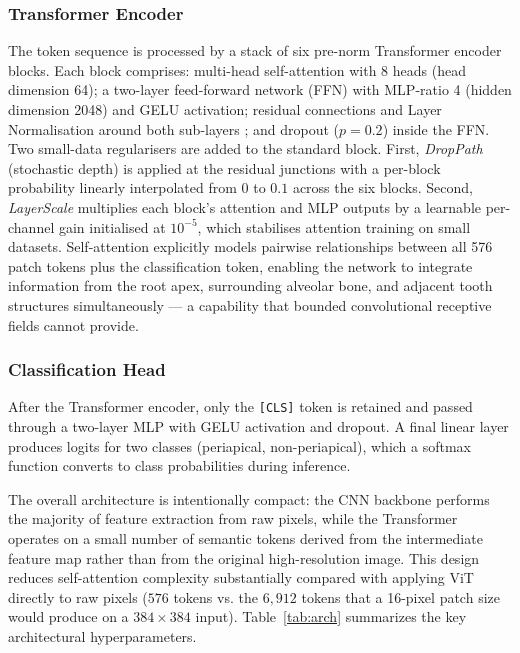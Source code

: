 \documentclass[conference]{IEEEtran}
\begin{document}
\subsubsection{Transformer Encoder}
The token sequence is processed by a stack of six pre-norm Transformer
encoder blocks. Each block comprises: multi-head self-attention with 8 heads
(head dimension 64); a two-layer feed-forward network (FFN) with MLP-ratio 4
(hidden dimension 2048) and GELU activation; residual connections and Layer
Normalisation around both sub-layers \cite{dosovitskiy2021}; and dropout
($p=0.2$) inside the FFN.
Two small-data regularisers are added to the standard block. First,
\emph{DropPath} (stochastic depth) is applied at the residual junctions with
a per-block probability linearly interpolated from 0 to $0.1$ across the
six blocks. Second, \emph{LayerScale} \cite{touvron2021layerscale}
multiplies each block's attention and MLP outputs by a learnable per-channel
gain initialised at $10^{-5}$, which stabilises attention training on small
datasets.
Self-attention explicitly models pairwise relationships between all 576
patch tokens plus the classification token, enabling the network to
integrate information from the root apex, surrounding alveolar bone, and
adjacent tooth structures simultaneously --- a capability that bounded
convolutional receptive fields cannot provide.

\subsubsection{Classification Head}
After the Transformer encoder, only the \texttt{[CLS]} token is retained and
passed through a two-layer MLP with GELU activation and dropout. A final
linear layer produces logits for two classes (periapical, non-periapical),
which a softmax function converts to class probabilities during inference.

The overall architecture is intentionally compact: the CNN backbone performs
the majority of feature extraction from raw pixels, while the Transformer
operates on a small number of semantic tokens derived from the intermediate
feature map rather than from the original high-resolution image. This design
reduces self-attention complexity substantially compared with applying ViT
directly to raw pixels ($576$ tokens vs. the $6{,}912$ tokens that a 16-pixel
patch size would produce on a $384\times384$ input). Table~\ref{tab:arch}
summarizes the key architectural hyperparameters.
\end{document}

